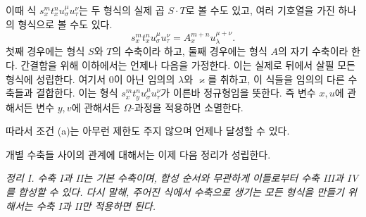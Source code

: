 
이때 식 $s_x^m t_x^n u_\sigma^\mu u_\tau^\nu$는 두 형식의 실제 곱 $S\cdot T$로 볼 수도 있고, 여러 기호열을 가진 하나의 형식으로 볼 수도 있다.
\[
s_x^m t_x^n u_\sigma^\mu u_\tau^\nu=A_x^{m+n}u_\lambda^{\mu+\nu}.
\]
첫째 경우에는 형식 $S$와 $T$의 수축이라 하고, 둘째 경우에는 \glqq{}형식 $A$의 자기 수축\grqq{}이라 한다. 간결함을 위해 이하에서는 언제나 다음을 가정한다. 이는 실제로 뒤에서 살필 모든 형식에 성립한다.
여기서 0이 아닌 임의의 $\lambda$와 $\varkappa$를 취하고, 이 식들을 임의의 다른 수축들과 결합한다. 이는 형식 $s_x^m t_y^n u_\sigma^\mu u_\tau^\nu$가 이른바 \glqq{}정규형\grqq{}임을 뜻한다. 즉 변수 $x,u$에 관해서든 변수 $y,v$에 관해서든 $\Omega$-과정을 적용하면 소멸한다.

따라서 조건 (a)는 아무런 제한도 주지 않으며 언제나 달성할 수 있다.

개별 수축들 사이의 관계에 대해서는 이제 다음 정리가 성립한다.

\emph{정리 I. 수축 I과 II는 기본 수축이며, 합성 순서와 무관하게 이들로부터 수축 III과 IV를 합성할 수 있다. 다시 말해, 주어진 식에서 수축으로 생기는 모든 형식을 만들기 위해서는 수축 I과 II만 적용하면 된다.}

